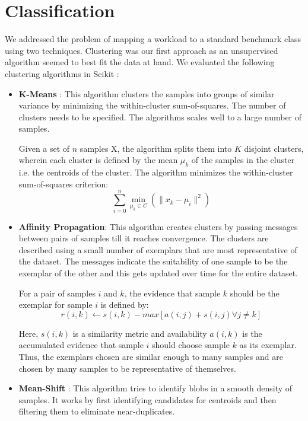 \section{Classification} \label{sec:classfication}

We addressed the problem of mapping a workload to a standard benchmark class
using two techniques. 
Clustering was our first approach as an unsupervised algorithm seemed to best
fit the data at hand. 
We evaluated the following clustering algorithms in Scikit :

\begin{itemize}
\item \textbf{K-Means} :
This algorithm clusters the samples into groups of similar variance by
minimizing the within-cluster sum-of-squares. The number of clusters
needs to be specified. The algorithms scales well to a large number of
samples.

Given a set of $n$ samples X, the algorithm splits them into $K$ disjoint
clusters, wherein each cluster is defined by the mean $\mu_k$ of the samples in
the cluster i.e. the centroids of the cluster.
The algorithm minimizes the within-cluster sum-of-squares criterion:
$$\sum_{i=0}^{n}\min_{\mu_{k} \in C}(\| x_{k} - \mu_{i} \|^2)$$

\item \textbf{Affinity Propagation}:
This algorithm creates clusters by passing messages between pairs of samples
till it reaches convergence. The clusters are described using a small number of
exemplars that are most representative of the dataset.
The messages indicate the suitability of one sample to be the exemplar of the
other and this gets updated over time for the entire dataset.

For a pair of samples $i$ and $k$, the evidence that sample $k$ should be the
exemplar for sample $i$ is defined by:
$$r(i,k) \leftarrow s(i,k) - max [a(i,j) + s(i,j) \forall j\neq k ]$$

Here, $s(i, k)$ is a similarity metric and availability $a(i, k)$ is the
accumulated evidence that sample $i$ should choose sample $k$ as its exemplar.
Thus, the exemplars chosen are similar enough to many samples and are
chosen by many samples to be representative of themselves.

\item \textbf{Mean-Shift} :
This algorithm tries to identify blobs in a smooth density of samples. 
It works by first identifying candidates for centroids and then filtering them
to eliminate near-duplicates.


\end{itemize}
